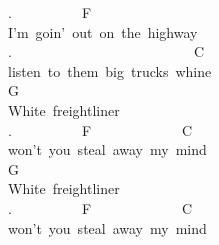 {.\ \ \ \ \ \ \ \ \ \ F\\
I'm\ goin'\ out\ on\ the\ highway\\
.\ \ \ \ \ \ \ \ \ \ \ \ \ \ \ \ \ \ \ \ \ \ \ \ \ \ C\\
listen\ to\ them\ big\ trucks\ whine\\
G\\
White\ freightliner\\
.\ \ \ \ \ \ \ \ \ \ F\ \ \ \ \ \ \ \ \ \ \ \ \ C\\
won't\ you\ steal\ away\ my\ mind\\
G\\
White\ freightliner\\
.\ \ \ \ \ \ \ \ \ \ F\ \ \ \ \ \ \ \ \ \ \ \ \ C\\
won't\ you\ steal\ away\ my\ mind}
